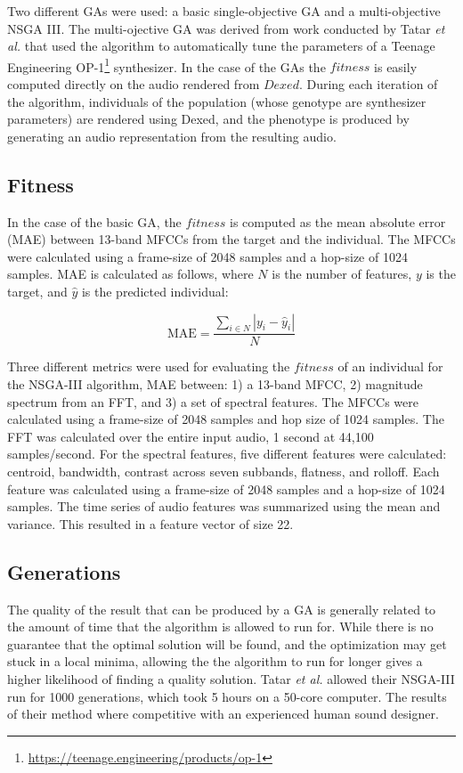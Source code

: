 Two different GAs were used: a basic single-objective GA and a multi-objective NSGA III. The multi-ojective GA was derived from work conducted by Tatar \textit{et al.} \cite{tatar2016automatic} that used the algorithm to automatically tune the parameters of a Teenage Engineering OP-1\footnote{\url{https://teenage.engineering/products/op-1}} synthesizer. In the case of the GAs the $fitness$ is easily computed directly on the audio rendered from $Dexed$. During each iteration of the algorithm, individuals of the population (whose genotype are synthesizer parameters) are rendered using Dexed, and the phenotype is produced by generating an audio representation from the resulting audio.

\subsection{Fitness}
In the case of the basic GA, the $fitness$ is computed as the mean absolute error (MAE) between 13-band MFCCs from the target and the individual. The MFCCs were calculated using a frame-size of 2048 samples and a hop-size of 1024 samples. MAE is calculated as follows, where $N$ is the number of features, $y$ is the target, and $\hat{y}$ is the predicted individual:

\begin{equation}\label{equation:mae}
    \text{MAE} = \frac{\sum_{i \in N}{|y_i - \hat{y}_i|}}{N}
\end{equation}
 
 Three different metrics were used for evaluating the $fitness$ of an individual for the NSGA-III algorithm, MAE between: 1) a 13-band MFCC, 2) magnitude spectrum from an FFT, and 3) a set of spectral features. The MFCCs were calculated using a frame-size of 2048 samples and hop size of 1024 samples. The FFT was calculated over the entire input audio, 1 second at 44,100 samples/second. For the spectral features, five different features were calculated: centroid, bandwidth, contrast across seven subbands, flatness, and rolloff. Each feature was calculated using a frame-size of 2048 samples and a hop-size of 1024 samples. The time series of audio features was summarized using the mean and variance. This resulted in a feature vector of size 22.
 
 \subsection{Generations}
 The quality of the result that can be produced by a GA is generally related to the amount of time that the algorithm is allowed to run for. While there is no guarantee that the optimal solution will be found, and the optimization may get stuck in a local minima, allowing the the algorithm to run for longer gives a higher likelihood of finding a quality solution. Tatar \textit{et al.} allowed their NSGA-III run for 1000 generations, which took 5 hours on a 50-core computer. The results of their method where competitive with an experienced human sound designer. 
 
